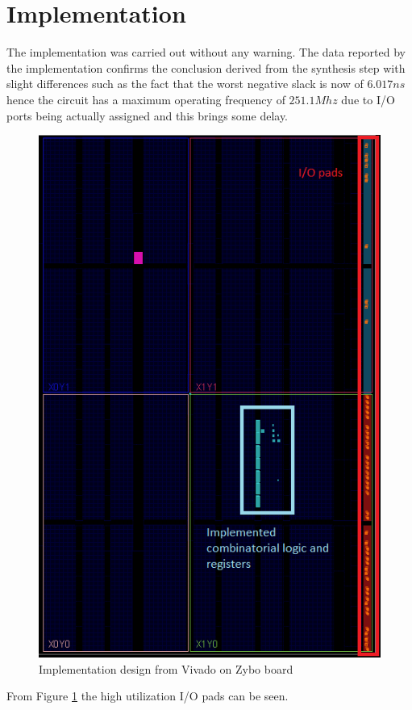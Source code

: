 \section{Implementation}
The implementation was carried out without any warning. The data reported by the implementation confirms the conclusion derived from the synthesis step with slight differences such as the fact that the worst negative slack is now of $6.017ns$ hence the circuit has a maximum operating frequency of $251.1Mhz$ due to I/O ports being actually assigned and this brings some delay. 

 \begin{figure}[H]
   \centering
   \includegraphics[width=0.5\linewidth]{./images/board}
   \caption{Implementation design from Vivado on Zybo board}
   \label{fig:board}
 \end{figure}
 From Figure \ref{fig:board} the high utilization I/O pads can be seen.